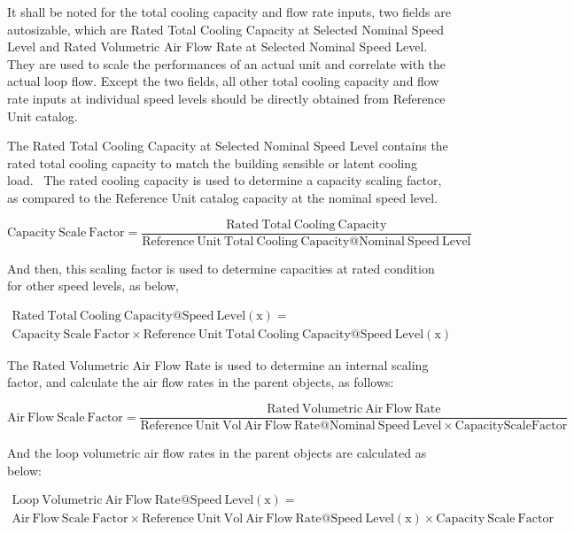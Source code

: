 It shall be noted for the total cooling capacity and flow rate inputs, two fields are autosizable, which are Rated Total Cooling Capacity at Selected Nominal Speed Level and Rated Volumetric Air Flow Rate at Selected Nominal Speed Level. They are used to scale the performances of an actual unit and correlate with the actual loop flow. Except the two fields, all other total cooling capacity and flow rate inputs at individual speed levels should be directly obtained from Reference Unit catalog.

The Rated Total Cooling Capacity at Selected Nominal Speed Level contains the rated total cooling capacity to match the building sensible or latent cooling load.~ The rated cooling capacity is used to determine a capacity scaling factor, as compared to the Reference Unit catalog capacity at the nominal speed level.

\begin{equation}
{\mathrm{Capacity~Scale~Factor}} = \frac{{{\mathrm{Rated~Total~Cooling~Capacity}}}}{{{\mathrm{Reference~Unit~Total~Cooling~Capacity}}@{\mathrm{Nominal~Speed~Level}}}}
\end{equation}

And then, this scaling factor is used to determine capacities at rated condition for other speed levels, as below,

\begin{equation}
\begin{array}{l}
{\mathrm{Rated~Total~Cooling~Capacity}}@{\mathrm{Speed~Level}}\left( {\mathrm{x}} \right) = \\
{\mathrm{Capacity~Scale~Factor}} \times {\mathrm{Reference~Unit~Total~Cooling~Capacity}}@{\mathrm{Speed~Level}}({\mathrm{x}})
\end{array}
\end{equation}

The Rated Volumetric Air Flow Rate is used to determine an internal scaling factor, and calculate the air flow rates in the parent objects, as follows:

\begin{equation}
{\mathrm{Air~Flow~Scale~Factor}} = \frac{{{\mathrm{Rated~Volumetric~Air~Flow~Rate}}}}{{{\mathrm{Reference~Unit~Vol~Air~Flow~Rate}}@{\mathrm{Nominal~Speed~Level}} \times {\mathrm{CapacityScaleFactor}}}}
\end{equation}

And the loop volumetric air flow rates in the parent objects are calculated as below:

\begin{equation}
\begin{array}{l}
{\mathrm{Loop~Volumetric~Air~Flow~Rate}}@{\mathrm{Speed~Level}}\left( {\mathrm{x}} \right) = \\ {\mathrm{Air~Flow~Scale~Factor}} \times {\mathrm{Reference~Unit~Vol~Air~Flow~Rate}}@{\mathrm{Speed~Level}}({\mathrm{x}}) \times {\mathrm{Capacity~Scale~Factor}}
\end{array}
\end{equation}

